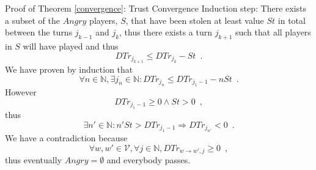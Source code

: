 \begin{sepproof}{Proof of Theorem \ref{convergence}: Trust Convergence}
  Induction step: There exists a subset of the $Angry$ players, $S$, that have been stolen at least value $St$ in total
  between the turns $j_{k-1}$ and $j_k$, thus there exists a turn $j_{k+1}$ such that all players in $S$ will have
  played and thus
  \begin{equation*}
    DTr_{j_{k+1}} \leq DTr_{j_k} - St \enspace.
  \end{equation*}
  We have proven by induction that
  \begin{equation*}
    \forall n \in \mathbb{N}, \exists j_n \in \mathbb{N} : DTr_{j_n} \leq DTr_{j_1-1} - nSt \enspace.
  \end{equation*}
  However
  \begin{equation*}
    DTr_{j_1-1} \geq 0 \wedge St > 0 \enspace,
  \end{equation*}
  thus
  \begin{equation*}
    \exists n' \in \mathbb{N} : n'St > DTr_{j_1-1} \Rightarrow DTr_{j_{n'}} < 0 \enspace.
  \end{equation*}
  We have a contradiction because
  \begin{equation*}
    \forall w,w' \in \mathcal{V}, \forall j \in \mathbb{N}, DTr_{w \rightarrow w', j} \geq 0 \enspace,
  \end{equation*}
  thus eventually $Angry = \emptyset$ and everybody passes.
\end{sepproof}
